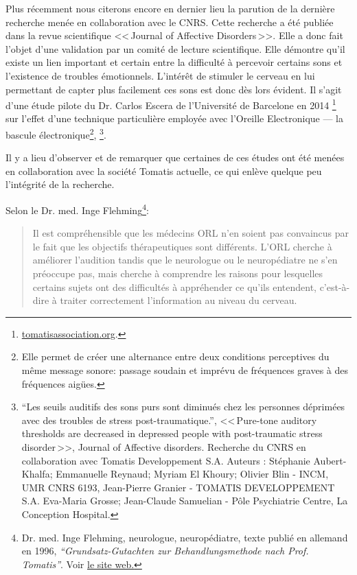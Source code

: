 Plus récemment nous citerons encore en dernier lieu la parution
de la dernière recherche menée en collaboration avec le CNRS. Cette
recherche a été publiée dans la revue scientifique <<\,Journal
of Affective Disorders\,>>. 
Elle a donc fait l'objet d'une validation
par un comité de lecture scientifique. Elle démontre qu'il existe
un lien important et certain entre la difficulté à percevoir
certains sons et l'existence de troubles émotionnels. 
L'intérêt de stimuler
le cerveau en lui permettant de capter plus facilement ces sons est
donc dès lors évident. Il s'agit d'une étude pilote du Dr. Carlos Escera
de l'Université de Barcelone en 2014%
\footnote{%
\href{http://tomatisassociation.org/scientific-validation-of-the-tomatis-effect-eeg-recordings-of-sound-from-brainstem-to-cerebral-cortex-encoding-university-of-barcelona-2014/}{tomatisassociation.org}.} sur l'effet d'une technique particulière employée avec l'Oreille Electronique
--- la bascule \label{bascule} électronique\footnote{Elle permet de créer une alternance entre deux conditions perceptives du même message sonore: passage soudain et imprévu de fréquences graves à des fréquences aigües.},%
\footnote{``Les seuils auditifs des sons purs 
		sont diminués chez les personnes déprimées avec des
		troubles de stress post-traumatique.'', <<\,Pure-tone auditory thresholds are decreased in depressed people with post-traumatic stress disorder\,>>, Journal of Affective disorders. Recherche du CNRS en collaboration
		avec Tomatis Developpement S.A. Auteurs : Stéphanie Aubert-Khalfa; Emmanuelle Reynaud; Myriam El Khoury;
		Olivier Blin - INCM, UMR CNRS 6193, Jean-Pierre Granier -
		TOMATIS DEVELOPPEMENT S.A. Eva-Maria Grosse; Jean-Claude Samuelian - Pôle Psychiatrie Centre, La Conception Hospital.}.

Il y a lieu d'observer et de remarquer que certaines de ces études
ont été menées en collaboration avec la société Tomatis actuelle,
ce qui enlève quelque peu l'intégrité de la recherche.

Selon le Dr. med. Inge Flehming\footnote{Dr. med. Inge Flehming,
	neurologue, neuropédiatre, texte publié en allemand
	en 1996, \emph{``Grundsatz-Gutachten zur Behandlungsmethode
	nach Prof. Tomatis''}. Voir \href{http://www.analytische-hoertherapie.de/uploads/tx\_templavoila/Grundsatzgutachten\_zur\_Behandlungsmethode\_nach\_Prof.\_Tomatis.pdf}{le site web.}}:
\begin{quotation}
Il est compréhensible que les médecins ORL n'en soient pas
 convaincus
par le fait que les objectifs thérapeutiques sont différents.
 L'ORL
cherche à améliorer l'audition tandis que le neurologue ou le neuropédiatre
ne s'en préoccupe pas, mais cherche à comprendre les raisons pour
lesquelles certains sujets ont des difficultés à appréhender ce qu'ils
entendent, c'est-à-dire à traiter correctement l'information au niveau
du cerveau.
\end{quotation}

